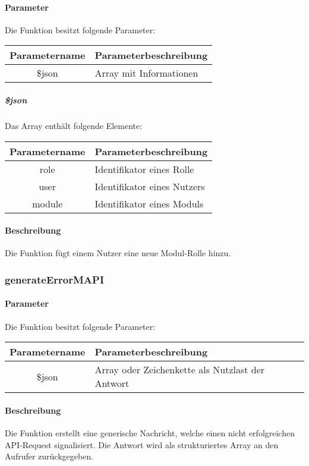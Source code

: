 \paragraph{Parameter} Die Funktion besitzt folgende Parameter:
\begin{table}[H]
	\begin{tabular}{|c|p{11cm}|}
		\hline
		\textbf{Parametername} & \textbf{Parameterbeschreibung} \\ \hline
		\$json & Array mit Informationen \\ \hline
	\end{tabular}
\end{table}
\subparagraph{\$json}Das Array enthält folgende Elemente:
\begin{table}[H]
	\begin{tabular}{|c|p{11cm}|}
		\hline
		\textbf{Parametername} & \textbf{Parameterbeschreibung} \\ \hline
		role     & Identifikator eines Rolle \\ \hline
		user     & Identifikator eines Nutzers \\ \hline
		module   & Identifikator eines Moduls \\ \hline
	\end{tabular}
\end{table}
\paragraph{Beschreibung} Die Funktion fügt einem Nutzer eine neue Modul-Rolle hinzu.
\subsubsection{generateErrorMAPI}
\paragraph{Parameter} Die Funktion besitzt folgende Parameter:
\begin{table}[H]
	\begin{tabular}{|c|p{11cm}|}
		\hline
		\textbf{Parametername} & \textbf{Parameterbeschreibung} \\ \hline
		\$json & Array oder Zeichenkette als Nutzlast der Antwort \\ \hline
	\end{tabular}
\end{table}
\paragraph{Beschreibung} Die Funktion erstellt eine generische Nachricht, welche einen nicht erfolgreichen API-Request signalisiert. Die Antwort wird als strukturiertes Array an den Aufrufer zurückgegeben.
